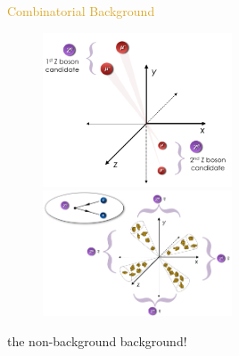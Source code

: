\begin{frame}{\textcolor{Goldenrod}{Combinatorial Background}}
  \begin{overlayarea}{\textwidth}{\textheight}
    \begin{figure}[h]
      \centering
      \includegraphics[height=0.5\textheight, width=0.5\textwidth]{./Images/103_extra_combinatorial_bkgs_01}
      \includegraphics[height=0.5\textheight, width=0.5\textwidth]{./Images/103_extra_combinatorial_bkgs_02}
    \end{figure}
    
    \itt
  \item the non-background background!
    \tti
  \end{overlayarea}
\end{frame}


